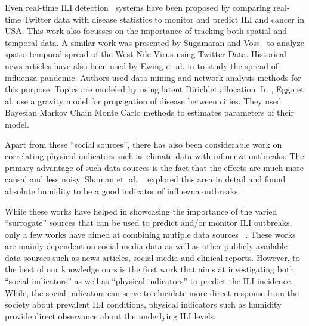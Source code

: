 Even real-time ILI detection~\cite{ref4} systems have been proposed by comparing 
real-time Twitter data with disease statistics to monitor and predict ILI and cancer 
in USA. This work also focusses on the importance of tracking both spatial and temporal 
data. A similar work was presented by Sugamaran and Voss~\cite{ref7} to analyze 
spatio-temporal spread of the West Nile Virus using Twitter Data. 
Historical news articles have also been used by Ewing et al. in
\cite{ref8} to study the spread of influenza pandemic. Authors used data
mining and network analysis methods for this purpose. Topics are modeled
by using latent Dirichlet allocation. In \cite{ref12}, Eggo et al. use a
gravity model for propagation of disease between cities. They used
Bayesian Markov Chain Monte Carlo methods to estimates parameters of
their model. %

Apart from these ``social sources'', there has also been considerable work on 
correlating physical indicators such as climate data with influenza outbreaks. 
The primary advantage of such data sources is the fact that the effects are much 
more causal and less noisy. 
Shaman et. al. ~\cite{ref9, Shaman_orig_humidity_link, Shaman_humidity_USA} 
explored this area in detail and found absolute humidity to be a good indicator of 
influezna outbreaks.

While these works have helped in showcasing the importance of the varied 
``surrogate'' sources that can be used to predict and/or monitor ILI outbreaks, 
only a few works have aimed at combining mutiple data sources 
~\cite{ref10, ref3}.  These works are mainly dependent on social
media data as well as other publicly available data sources such as news 
articles, social media and clinical reports. However, to the best of our knowledge 
ours is the first work that aims at investigating both ``social indicators'' as well 
as ``physical indicators'' to predict the ILI incidence. While, the social indicators
can serve to elucidate more direct response from the society about prevalent ILI 
conditions, physical indicators such as humidity provide direct observance about 
the underlying ILI levels. 

